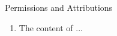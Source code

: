 \begin{section}{Permissions and Attributions}
\begin{enumerate}
\item The content of ...
\end{enumerate}
\end{section}
